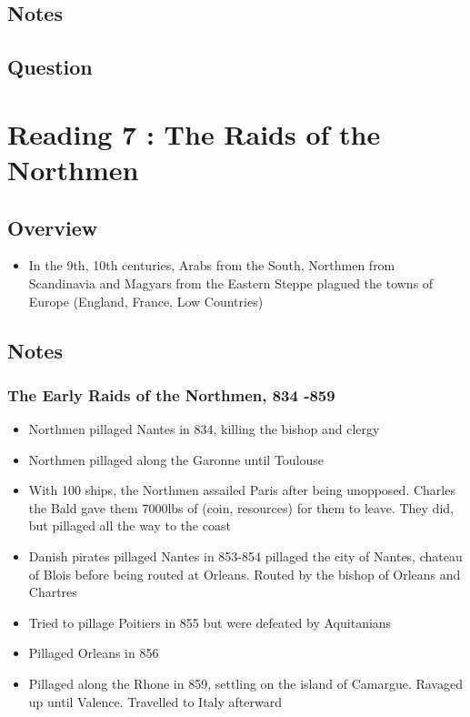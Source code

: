 \documentclass[12pt]{article}
\begin{document}
\subsection*{Notes}

\subsection*{Question}

\section*{Reading 7 : The Raids of the Northmen}

\subsection*{Overview}
\begin{itemize}
	\item In the 9th, 10th centuries, Arabs from the South, Northmen from Scandinavia and Magyars from the Eastern Steppe plagued the towns of Europe (England, France, Low Countries)
\end{itemize}

\subsection*{Notes}

\subsubsection*{The Early Raids of the Northmen, 834 -859}
\begin{itemize}
	\item Northmen pillaged Nantes in 834, killing the bishop and clergy
	\item Northmen pillaged along the Garonne until Toulouse
	\item With 100 ships, the Northmen assailed Paris after being unopposed. Charles the Bald gave them 7000lbs of (coin, resources) for them to leave. They did, but pillaged all the way to the coast
	\item Danish pirates pillaged Nantes in 853-854 pillaged the city of Nantes, chateau of Blois before being routed at Orleans. Routed by the bishop of Orleans and Chartres
	\item Tried to pillage Poitiers in 855 but were defeated by Aquitanians
	\item Pillaged Orleans in 856
	\item Pillaged along the Rhone in 859, settling on the island of Camargue. Ravaged up until Valence. Travelled to Italy afterward
\end{itemize}
\end{document}
